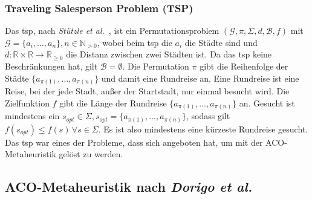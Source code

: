 \documentclass[fontsize=12, a4aper]{scrartcl}
\begin{document}
	\subsubsection{Traveling Salesperson Problem (TSP)} \label{subsubsec:Einfuehrung_In_Ameisenalgorithmen:Traveling_Salesperson_Problem_TSP}
	
	Das \ac{tsp}, nach \textit{Stützle et al.}~\cite{stutzle1999aco}, ist ein Permutationsproblem \((\mathcal{G}, \pi, \Sigma, d, \mathcal{B}, f)\) mit \(\mathcal{G} = \{a_i, \dots, a_n\}, n \in \mathbb{N}_{> 0}\), wobei beim \ac{tsp} die \(a_i\) die Städte sind und \(d: \mathbb{R} \times \mathbb{R} \to \mathbb{R}_{\geq 0}\) die Distanz zwischen zwei Städten ist. Da das \ac{tsp} keine Beschränkungen hat, gilt \(\mathcal{B} = \emptyset\). Die Permutation \(\pi\) gibt die Reihenfolge der Städte \(\{a_{\pi(1)}, \dots, a_{\pi(n)}\}\) und damit eine Rundreise an. Eine Rundreise ist eine Reise, bei der jede Stadt, außer der Startstadt, nur einmal besucht wird. Die Zielfunktion \(f\) gibt die Länge der Rundreise \(\{a_{\pi(1)}, \dots, a_{\pi(n)}\}\) an. Gesucht ist mindestens ein \(s_{opt} \in \Sigma, s_{opt} = \{a_{\pi(1)}, \dots, a_{\pi(n)}\}\), sodass gilt \(f(s_{opt}) \leq f(s) \, \forall s \in \Sigma\). Es ist also mindestens eine kürzeste Rundreise gesucht. Das \ac{tsp} war eines der Probleme, dass sich angeboten hat, um mit der ACO-Metaheuristik gelöst zu werden.
		
	\subsection{ACO-Metaheuristik nach \textit{Dorigo et al.}~\cite{dorigo1996ant}} \label{subsec:Grundlagen:ACO_-_Metaheuristik}
	
\end{document}
